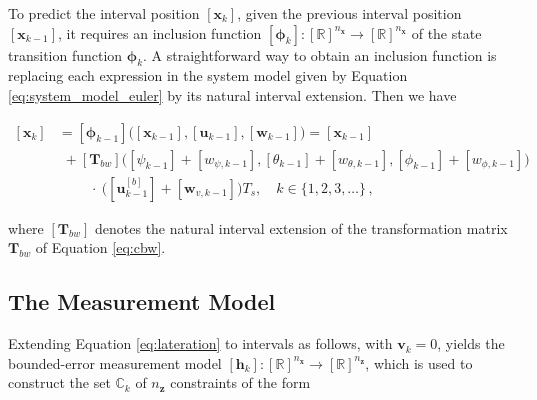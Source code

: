 \noindent
To predict the interval position $[\bm{x}_k]$, given the previous interval position $[\bm{x}_{k-1}]$, it requires an inclusion function $[\bm{\phi}_{k}]: [\mathbb{R}]^{n_{\bm{x}}} \rightarrow [\mathbb{R}]^{n_{\bm{x}}}$ of the state transition function $\bm{\phi}_{k}$. A straightforward way to obtain an inclusion function is replacing each expression in the system model given by Equation \ref{eq:system_model_euler} by its natural interval extension. Then we have

\begin{equation}\label{eq:system_model_int}
\begin{split}
  [\bm{x}_{k}] &= [\bm{\phi}_{k-1}]\big([\bm{x}_{k-1}], [\bm{u}_{k-1}], [\bm{w}_{k-1}]\big) = [\bm{x}_{k-1}] \\
  &\mathrel{\phantom{i}}+ [\bm{T}_{bw}]\big([\psi_{k-1}] + [w_{\psi,{k-1}}], [\theta_{k-1}] + [w_{\theta,{k-1}}], [\phi_{k-1}] + [w_{\phi,{k-1}}]\big) \\
  &\mathrel{\phantom{iiiiii}}\: \cdot \: \big([\bm{u}^{[b]}_{k-1}] + [\bm{w}_{v, {k-1}}]\big) T_s, \quad k \in \{1, 2, 3, \dots\}\,,
  \end{split}
\end{equation}

\noindent
where $[\bm{T}_{bw}]$ denotes the natural interval extension of the transformation matrix $\bm{T}_{bw}$ of Equation \ref{eq:cbw}.


\subsection{The Measurement Model}

Extending Equation \ref{eq:lateration} to intervals as follows, with $\bm{v}_{k} = 0$, yields the bounded-error measurement model $[\bm{h}_k]: [\mathbb{R}]^{n_{\bm{x}}} \rightarrow [\mathbb{R}]^{n_{\bm{z}}}$, which is used to construct the set $\mathbb{C}_k$ of $n_{\bm{z}}$ constraints of the form

